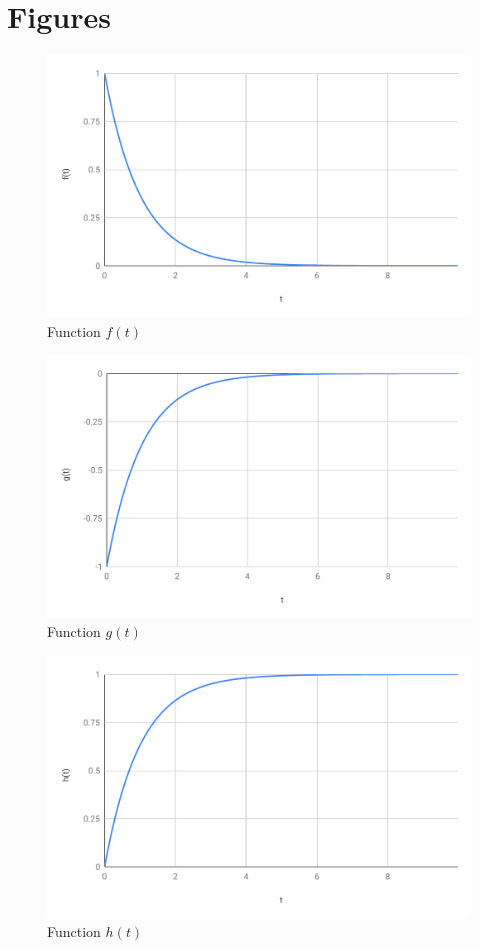 \section{Figures}
%
\begin{figure}[ht]
    \centering
    \includegraphics[scale=0.74]{image/05-RC-RL/f.pdf}
    \caption{Function $f(t)$}
    \label{figure.05.f}
\end{figure}
%
\begin{figure}[ht]
    \centering
    \includegraphics[scale=0.74]{image/05-RC-RL/g.pdf}
    \caption{Function $g(t)$}
    \label{figure.05.g}
\end{figure}
%
\begin{figure}[ht]
    \centering
    \includegraphics[scale=0.74]{image/05-RC-RL/h.pdf}
    \caption{Function $h(t)$}
    \label{figure.05.h}
\end{figure}
